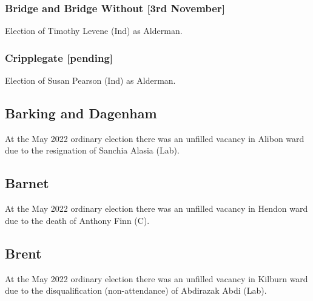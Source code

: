 \documentclass[a4paper,openany]{book}
\begin{document}
\begin{resultsiii}
\subsubsection*{Bridge and Bridge Without \hspace*{\fill}\nolinebreak[1]%
	\enspace\hspace*{\fill}
	[3rd November]}


Election of Timothy Levene (Ind) as Alderman.

\subsubsection*{Cripplegate \hspace*{\fill}\nolinebreak[1]%
	\enspace\hspace*{\fill}
	[pending]}


Election of Susan Pearson (Ind) as Alderman.

\subsection*{Barking and Dagenham}

At the May 2022 ordinary election there was an unfilled vacancy in Alibon ward due to the resignation of Sanchia Alasia (Lab).%

\subsection*{Barnet}

At the May 2022 ordinary election there was an unfilled vacancy in Hendon ward due to the death of Anthony Finn (C).%

\subsection*{Brent}

At the May 2022 ordinary election there was an unfilled vacancy in Kilburn ward due to the disqualification (non-attendance) of Abdirazak Abdi (Lab).%


\end{resultsiii}
\end{document}
